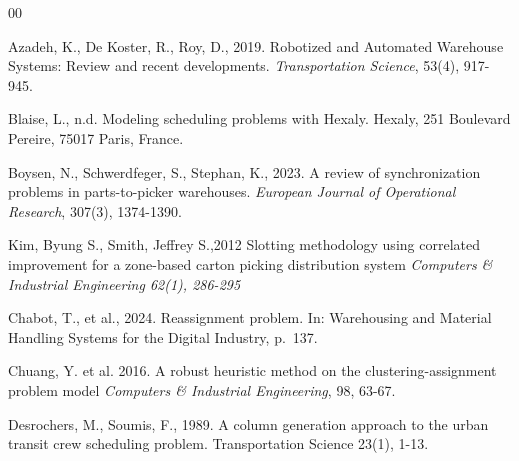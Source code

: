 \documentclass[preprint,review,11pt,authoryear]{elsarticle}
\begin{document}


\begin{thebibliography}{00}


Azadeh, K., De Koster, R., Roy, D., 2019. Robotized and Automated Warehouse Systems: Review and recent developments. \textit{Transportation Science}, 53(4), 917-945.


Blaise, L., n.d. Modeling scheduling problems with Hexaly. Hexaly, 251 Boulevard Pereire, 75017 Paris, France.

Boysen, N., Schwerdfeger, S., Stephan, K., 2023. A review of synchronization problems in parts-to-picker warehouses. \textit{European Journal of Operational Research}, 307(3), 1374-1390.

Kim, Byung S., Smith, Jeffrey S.,2012
Slotting methodology using correlated improvement for a zone-based carton picking distribution system
\textit{Computers \& Industrial Engineering 62(1), 286-295}


Chabot, T., et al., 2024. Reassignment problem. In: Warehousing and Material Handling Systems for the Digital Industry, p.~137.

Chuang, Y. et al. 2016. A robust heuristic method on the clustering-assignment problem model
\textit{Computers \& Industrial Engineering}, 98, 63-67.


Desrochers, M., Soumis, F., 1989. A column generation approach to the urban transit crew scheduling problem. Transportation Science 23(1), 1-13.


\end{thebibliography}
\end{document}
